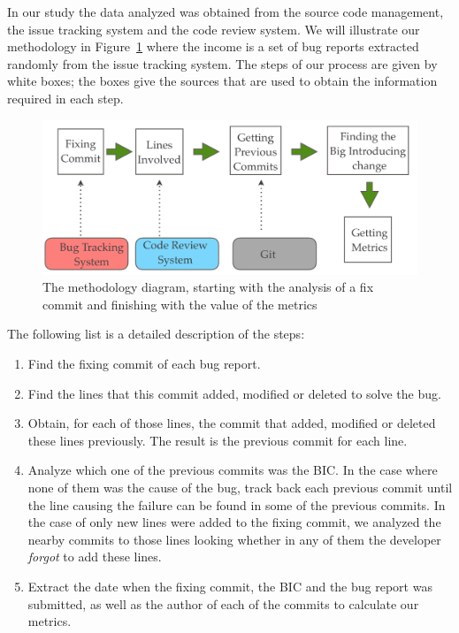 \documentclass[10pt, conference]{IEEEtran}
\begin{document}
In our study the data analyzed was obtained from the source code management, the issue tracking system and the code review system. We will illustrate our methodology in Figure~\ref{fig:methodology} where the income is a set of bug reports extracted randomly from the issue tracking system. The steps of our process are given by white boxes; the  boxes give the sources that are used to obtain the information required in each step.

\begin{figure}[ht]
\centering
\includegraphics[width=\columnwidth]{methodology.png}
\caption{The methodology diagram, starting with the analysis of a fix commit and finishing with the value of the metrics}
\label{fig:methodology}       %
\end{figure}

The following list is a detailed description of the steps: 

\begin{enumerate}
		\item Find the fixing commit of each bug report.
		\item Find the lines that this commit added, modified or deleted to solve the bug.
		\item Obtain, for each of those lines, the commit that added, modified or deleted these lines previously. The result is the previous commit for each line.
		\item Analyze which one of the previous commits was the BIC. In the case where none of them was the cause of the bug, track back each previous commit until the line causing the failure can be found in some of the previous commits. In the case of only new lines were added to the fixing commit, we analyzed the nearby commits to those lines looking whether in any of them the developer \emph{forgot} to add these lines.
		\item Extract the date when the fixing commit, the BIC and the bug report was submitted, as well as the author of each of the commits to calculate our metrics.	
\end{enumerate} 
\end{document}
